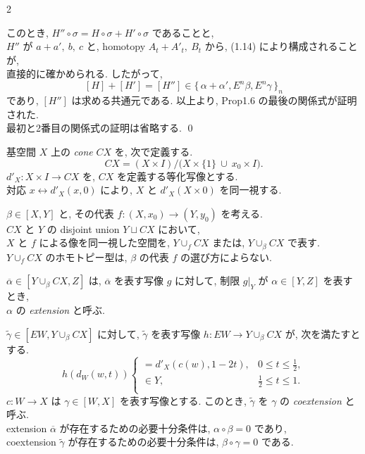 \documentclass[10pt, leqno]{ltjsarticle}
\newcommand{\todai}[2][]{\{\,#2\,\}_{#1}}      %
\numberwithin{equation}{section}
\theoremstyle{plain}
\theoremstyle{definition}
\theoremstyle{remark}
\begin{document}
\begin{paracol}{2}

このとき, 
\(H''\circ \sigma = 
H\circ \sigma + H'\circ \sigma\)
であることと,\\
\(H''\) が
\(a+a',\ b,\ c\) と, homotopy \(A_t + A'_t,\ B_t\) 
から, (1.14) により構成されることが, \\
直接的に確かめられる.
したがって,
\[
[H] + [H'] = [H''] \in 
\todai[n]{\alpha + \alpha', E^n\beta, E^n\gamma}
\]
であり, 
\([H'']\) は求める共通元である.
以上より,
Prop1.6 の最後の関係式が証明された.\\
最初と2番目の関係式の証明は省略する.
\qed


基空間 $X$ 上の \emph{cone} \(CX\) を, 次で定義する.
\[
CX=(X\times I)/\bigl(X\times\{1\}\ \cup\ x_0\times I\bigr).
\]
$d'_X:X\times I\to CX$ を, \(CX\) を定義する等化写像とする.\\
対応 $x\longleftrightarrow d'_X(x,0)$ により, 
$X$ と $d'_X(X\times {0})$ を同一視する. 

$\beta\in[X, Y]$ と, その代表 $f:(X,x_0)\to(Y,y_0)$ を考える.\\
\(CX\) と \(Y\) の disjoint union \(Y \sqcup CX\)
において, \\
\(X\) と \(f\) による像を同一視した空間を,
\(Y\cup_f CX\) または, \(Y\cup_\beta CX\) で表す.\\
$Y\cup_f CX$ のホモトピー型は, \(\beta\) の代表 $f$ の選び方によらない. 

\(\overline{\alpha}\in[Y\cup_\beta CX, Z]\)
は, \(\overline{\alpha}\) を表す写像 \(g\)
に対して, 
制限 \(g|_{Y}\) が \(\alpha\in[Y,Z]\) を表すとき,\\
$\alpha$ の \emph{extension} と呼ぶ.

\(\widetilde{\gamma}\in[EW,Y\cup_\beta CX]\)
に対して, \(\widetilde{\gamma}\) を表す写像 
\(h:EW\to Y\cup_\beta CX\)
が, 次を満たすとする.
\[
h(d_W(w, t)) \left\{
\begin{array}{ll}
= d'_X(c(w), 1-2t), & 0 \leq t \leq \frac{1}{2}, \\
\in Y, & \frac{1}{2} \leq t \leq 1. \\
\end{array}\right.
\]
\(c:W\to X\) は \(\gamma\in[W,X]\) を表す写像とする.
このとき, \(\widetilde{\gamma}\) を \(\gamma\) の \emph{coextension} と呼ぶ.\\
extension $\overline\alpha$ が存在するための必要十分条件は,
$\alpha\circ \beta=0$ であり,\\
coextension $\widetilde{\gamma}$ が存在するための必要十分条件は,
$\beta\circ\gamma=0$ である. 


\end{paracol}
\end{document}
